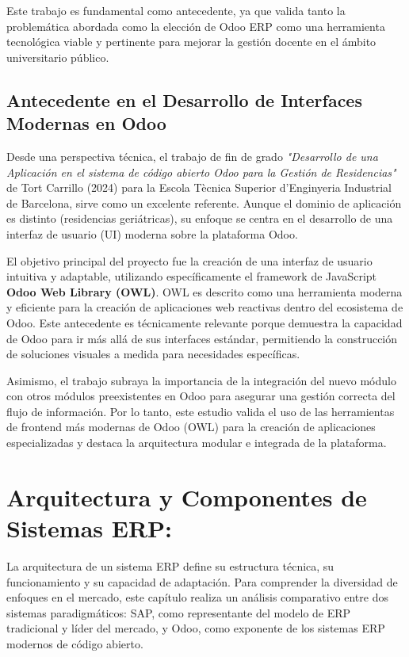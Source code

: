 \documentclass[12pt,letterpaper,spanish]{report}
\begin{document}
Este trabajo es fundamental como antecedente, ya que valida tanto la problemática abordada como la elección de Odoo ERP como una herramienta tecnológica viable y pertinente para mejorar la gestión docente en el ámbito universitario público.

\subsection{Antecedente en el Desarrollo de Interfaces Modernas en Odoo}
\label{sub:antecedente_desarrollo_tecnico}

Desde una perspectiva técnica, el trabajo de fin de grado \textit{"Desarrollo de una Aplicación en el sistema de código abierto Odoo para la Gestión de Residencias"} de Tort Carrillo (2024) para la Escola Tècnica Superior d'Enginyeria Industrial de Barcelona, sirve como un excelente referente. Aunque el dominio de aplicación es distinto (residencias geriátricas), su enfoque se centra en el desarrollo de una interfaz de usuario (UI) moderna sobre la plataforma Odoo.

El objetivo principal del proyecto fue la creación de una interfaz de usuario intuitiva y adaptable, utilizando específicamente el framework de JavaScript \textbf{Odoo Web Library (OWL)}. OWL es descrito como una herramienta moderna y eficiente para la creación de aplicaciones web reactivas dentro del ecosistema de Odoo. Este antecedente es técnicamente relevante porque demuestra la capacidad de Odoo para ir más allá de sus interfaces estándar, permitiendo la construcción de soluciones visuales a medida para necesidades específicas.

Asimismo, el trabajo subraya la importancia de la integración del nuevo módulo con otros módulos preexistentes en Odoo para asegurar una gestión correcta del flujo de información. Por lo tanto, este estudio valida el uso de las herramientas de frontend más modernas de Odoo (OWL) para la creación de aplicaciones especializadas y destaca la arquitectura modular e integrada de la plataforma.




\section{Arquitectura y Componentes de Sistemas ERP:}

La arquitectura de un sistema ERP define su estructura técnica, su funcionamiento y su capacidad de adaptación. Para comprender la diversidad de enfoques en el mercado, este capítulo realiza un análisis comparativo entre dos sistemas paradigmáticos: SAP, como representante del modelo de ERP tradicional y líder del mercado, y Odoo, como exponente de los sistemas ERP modernos de código abierto.
\end{document}
